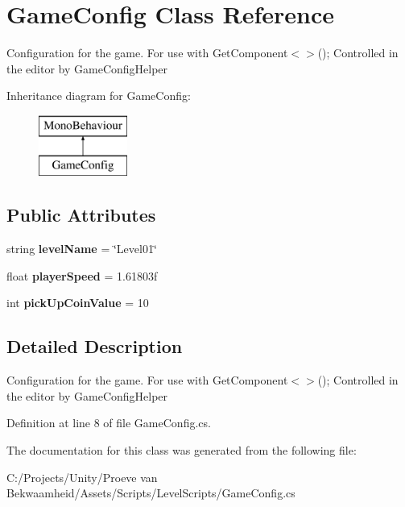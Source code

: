 \hypertarget{class_game_config}{\section{Game\+Config Class Reference}
\label{class_game_config}
}


Configuration for the game. For use with Get\+Component$<$$>$(); Controlled in the editor by Game\+Config\+Helper  


Inheritance diagram for Game\+Config\+:\begin{figure}[H]
\begin{center}
\leavevmode
\includegraphics[height=2.000000cm]{class_game_config}
\end{center}
\end{figure}
\subsection*{Public Attributes}
\begin{DoxyCompactItemize}
\item 
\hypertarget{class_game_config_a7ff8b994fa969ec37d290f5417e9f668}{string {\bfseries level\+Name} = \char`\"{}Level01\char`\"{}}\label{class_game_config_a7ff8b994fa969ec37d290f5417e9f668}

\item 
\hypertarget{class_game_config_a57453d5451afd7d19e541567385a5e24}{float {\bfseries player\+Speed} = 1.\+61803f}\label{class_game_config_a57453d5451afd7d19e541567385a5e24}

\item 
\hypertarget{class_game_config_ac61c80bdbd45f3fc7dc1a0e71bb993be}{int {\bfseries pick\+Up\+Coin\+Value} = 10}\label{class_game_config_ac61c80bdbd45f3fc7dc1a0e71bb993be}

\end{DoxyCompactItemize}


\subsection{Detailed Description}
Configuration for the game. For use with Get\+Component$<$$>$(); Controlled in the editor by Game\+Config\+Helper 



Definition at line 8 of file Game\+Config.\+cs.



The documentation for this class was generated from the following file\+:\begin{DoxyCompactItemize}
\item 
C\+:/\+Projects/\+Unity/\+Proeve van Bekwaamheid/\+Assets/\+Scripts/\+Level\+Scripts/Game\+Config.\+cs\end{DoxyCompactItemize}
